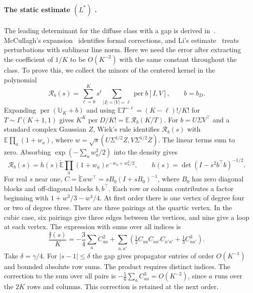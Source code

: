 \paragraph{The static estimate $(L^*)$ .}
The leading determinant for the diffuse class with a gap is derived in~\cite{dw}. McCullagh's
expansion~\cite{mcc} identifies formal corrections, and Li's estimate~\cite{li} treats
perturbations with sublinear line norm. Here we need the error after extracting the coefficient of
$1/K$ to be $O(K^{-2})$ with the same constant throughout the class. To prove this, we collect the
minors of the centered kernel in the polynomial
\[
 \mathcal R_b(s)=\sum_{\ell=0}^K s^\ell
         \sum_{|I|=|V|=\ell}\operatorname{per} b[I,V],\qquad b=b_D .
\]
Expanding $\operatorname{per}(\mathbb U_K+b)$ and using $\mathbb E T^{-\ell}=(K-\ell)!/K!$ for
$T\sim\Gamma(K+1,1)$ gives $K^K\operatorname{per}D/K!=\mathbb E\,\mathcal R_b(K/T)$. For
$b=U\Sigma V^\top$ and a standard complex Gaussian $Z$, Wick's rule identifies $\mathcal R_b(s)$
with $\mathbb E\prod_a(1+w_a)$, where $w=\sqrt{s}(U\Sigma^{1/2}Z,V\Sigma^{1/2}\overline Z)$. The
linear terms sum to zero. Absorbing $\exp(-\sum_a w_a^2/2)$ into the density gives
\[
 \mathcal R_b(s)=h(s)\widetilde{\mathbb E}\prod_a (1+w_a)e^{-w_a+w_a^2/2},\qquad
 h(s)=\det(I-s^2b^\top b)^{-1/2}.
\]
For real $s$ near one, $C=\widetilde{\mathbb E}ww^\top=sB_0(I+sB_0)^{-1}$, where $B_0$ has zero
diagonal blocks and off-diagonal blocks $b,b^\top$. Each row or column contributes a factor
beginning with $1+w^3/3-w^4/4$. At first order there is one vertex of degree four or two of degree
three. There are three pairings at the quartic vertex. In the cubic case, six pairings give three
edges between the vertices, and nine give a loop at each vertex. The expression with sums over all
indices is
\[
 \frac{\mathfrak f(s)}K=-\frac34\sum_a C_{aa}^2+
 \sum_{a,a'}\left(\tfrac12 C_{aa}C_{aa'}C_{a'a'}+\tfrac13 C_{aa'}^3\right).
\]
Take $\delta=\gamma/4$. For $|s-1|\le\delta$ the gap gives propagator entries of order $O(K^{-1})$
and bounded absolute row sums. The product requires distinct indices. The correction to the sum
over all pairs is $-\frac56\sum_a C_{aa}^3=O(K^{-2})$, since $a$ runs over the $2K$ rows and
columns. This correction is retained at the next order.


